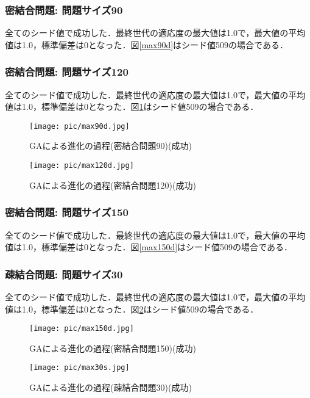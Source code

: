 \documentclass[a4j]{jarticle}
\begin{document}
\subsubsection*{密結合問題: 問題サイズ90}
全てのシード値で成功した．最終世代の適応度の最大値は1.0で，最大値の平均
値は1.0，標準偏差は0となった．図\ref{max90d}はシード値509の場合である．
\subsubsection*{密結合問題: 問題サイズ120}
全てのシード値で成功した．最終世代の適応度の最大値は1.0で，最大値の平均
値は1.0，標準偏差は0となった．図\ref{max120d}はシード値509の場合である．
\begin{figure}[htb]
 \begin{minipage}{0.5\hsize}
  \begin{center}
  \texttt{[image: pic/max90d.jpg]}
  \end{center}
  \caption{GAによる進化の過程(密結合問題90)(成功)}
  \label{max90d}
 \end{minipage}
 \begin{minipage}{0.5\hsize}
  \begin{center}
  \texttt{[image: pic/max120d.jpg]}
  \end{center}
  \caption{GAによる進化の過程(密結合問題120)(成功)}
  \label{max120d}
 \end{minipage}
\end{figure}

\subsubsection*{密結合問題: 問題サイズ150}
全てのシード値で成功した．最終世代の適応度の最大値は1.0で，最大値の平均
値は1.0，標準偏差は0となった．図\ref{max150d}はシード値509の場合である．
\subsubsection*{疎結合問題: 問題サイズ30}
全てのシード値で成功した．最終世代の適応度の最大値は1.0で，最大値の平均
値は1.0，標準偏差は0となった．図\ref{max30s}はシード値509の場合である．


\begin{figure}[htb]
 \begin{minipage}{0.5\hsize}
  \begin{center}
  \texttt{[image: pic/max150d.jpg]}
  \end{center}
  \caption{GAによる進化の過程(密結合問題150)(成功)}
  \label{max150d}
 \end{minipage}
 \begin{minipage}{0.5\hsize}
  \begin{center}
  \texttt{[image: pic/max30s.jpg]}
  \end{center}
  \caption{GAによる進化の過程(疎結合問題30)(成功)}
  \label{max30s}
 \end{minipage}
\end{figure}
\end{document}
